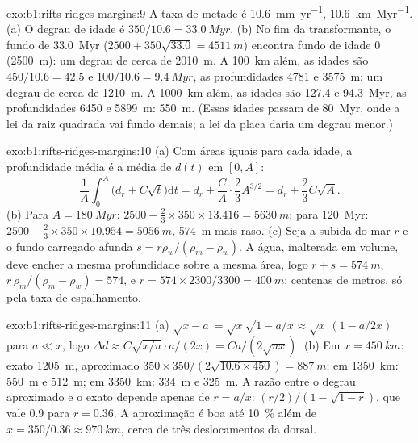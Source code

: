 \begin{solution}{exo:b1:rifts-ridges-margins:9}
A taxa de metade é \qty{10.6}{mm.yr^{-1}}, \qty{10.6}{km.Myr^{-1}}. (a) O degrau de idade é
$350/10.6 = \qty{33.0}{Myr}$. (b) No fim da transformante, o fundo de \qty{33.0}{Myr}
($2500 + 350\sqrt{33.0} = \qty{4511}{m}$) encontra fundo de idade 0 (\qty{2500}{m}): um degrau de cerca de \qty{2010}{m}. A \qty{100}{km} além,
as idades são $450/10.6 = 42.5$ e $100/10.6 = \qty{9.4}{Myr}$, as profundidades
4781 e \qty{3575}{m}: um degrau de cerca de \qty{1210}{m}. A \qty{1000}{km} além,
as idades são 127.4 e \qty{94.3}{Myr}, as profundidades 6450 e \qty{5899}{m}:
\qty{550}{m}. (Essas idades passam de \qty{80}{Myr}, onde a lei da raiz quadrada
vai fundo demais; a lei da placa daria um degrau menor.)
\end{solution}

\begin{solution}{exo:b1:rifts-ridges-margins:10}
(a) Com áreas iguais para cada idade, a profundidade média é a média de $d(t)$ em
$[0, A]$:
\[
  \frac1A\int_0^A\bigl(d_r + C\sqrt t\bigr)\mathrm dt = d_r + \frac CA\cdot\frac23A^{3/2}
  = d_r + \frac23C\sqrt A.
\]
(b) Para $A = \qty{180}{Myr}$: $2500 + \frac23\times350\times13.416 =
\qty{5630}{m}$; para \qty{120}{Myr}: $2500 + \frac23\times350\times10.954 =
\qty{5056}{m}$, \qty{574}{m} mais raso. (c) Seja a subida do mar $r$ e o fundo
carregado afunda $s = r\rho_w/(\rho_m - \rho_w)$. A água, inalterada em volume, deve
encher a mesma profundidade sobre a mesma área, logo $r + s = \qty{574}{m}$,
$r\,\rho_m/(\rho_m - \rho_w) = 574$, e $r = 574\times2300/3300 =
\qty{400}{m}$: centenas de metros, só pela taxa de espalhamento.
\end{solution}

\begin{solution}{exo:b1:rifts-ridges-margins:11}
(a) $\sqrt{x - a} = \sqrt x\sqrt{1 - a/x} \approx \sqrt x\,(1 - a/2x)$ para
$a \ll x$, logo
$\Delta d \approx C\sqrt{x/u}\cdot a/(2x) = Ca/(2\sqrt{ux})$.
(b) Em $x = \qty{450}{km}$: exato \qty{1205}{m}, aproximado
$350\times350/(2\sqrt{10.6\times450}) = \qty{887}{m}$; em \qty{1350}{km}:
\qty{550}{m} e \qty{512}{m}; em \qty{3350}{km}: \qty{334}{m} e
\qty{325}{m}. A razão entre o degrau aproximado e o exato depende apenas de
$r = a/x$: $(r/2)/(1 - \sqrt{1 - r})$, que vale 0.9 para $r = 0.36$. A
aproximação é boa até \qty{10}{\percent} além de $x = 350/0.36 \approx
\qty{970}{km}$, cerca de três deslocamentos da dorsal.
\end{solution}

